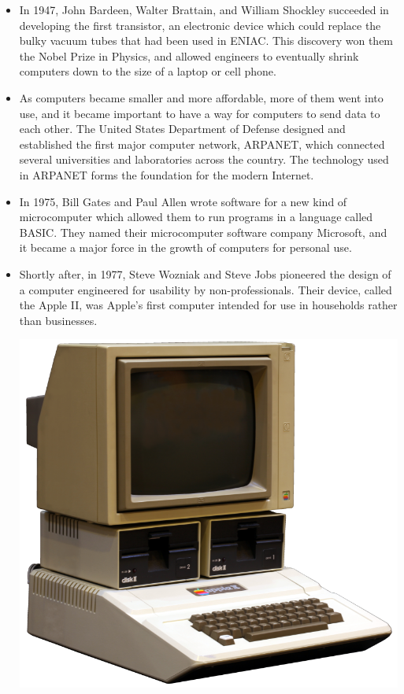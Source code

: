 \begin{itemize}
\begin{marginfigure}
	\caption{ENIAC, the first fully electronic computer, hosted at the University of Pennsylvania.}
	\label{fig:eniac}
\end{marginfigure}
\item In 1947, John Bardeen, Walter Brattain, and William Shockley succeeded in developing the first transistor, an electronic device which could replace the bulky vacuum tubes that had been used in ENIAC. This discovery won them the Nobel Prize in Physics, and allowed engineers to eventually shrink computers down to the size of a laptop or cell phone.
\item As computers became smaller and more affordable, more of them went into use, and it became important to have a way for computers to send data to each other. The United States Department of Defense designed and established the first major computer network, ARPANET, which connected several universities and laboratories across the country. The technology used in ARPANET forms the foundation for the modern Internet.
\item In 1975, Bill Gates and Paul Allen wrote software for a new kind of microcomputer which allowed them to run programs in a language called BASIC. They named their microcomputer software company Microsoft, and it became a major force in the growth of computers for personal use.
\item Shortly after, in 1977, Steve Wozniak and Steve Jobs pioneered the design of a computer engineered for usability by non-professionals. Their device, called the Apple II, was Apple's first computer intended for use in households rather than businesses.
\begin{marginfigure}
	\centering
	\includegraphics[width=\textwidth]{images/appleii.png}

\end{marginfigure}
\end{itemize}
